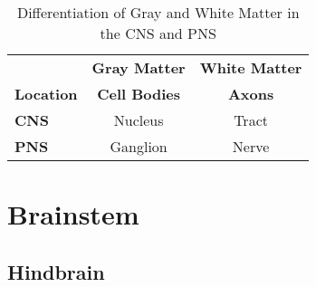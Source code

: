 \begin{table}[htbp]
    \centering
    \begin{tabular}{lcc}
        \toprule
        & \textbf{Gray Matter} & \textbf{White Matter} \\
        \cmidrule(lr){2-3}
        \textbf{Location} & \textbf{Cell Bodies} & \textbf{Axons} \\
        \midrule
        \textbf{CNS} & Nucleus & Tract \\
        \textbf{PNS} & Ganglion & Nerve \\
        \bottomrule
    \end{tabular}
    \caption{Differentiation of Gray and White Matter in the CNS and PNS}\label{tab:gray_white}
\end{table}


\section{Brainstem}

\subsection{Hindbrain}

